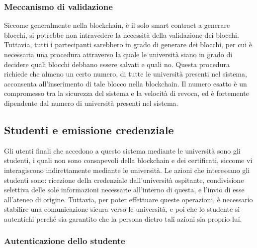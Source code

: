 \documentclass[a4paper,12pt]{article}
\begin{document}
\subsubsection{Meccanismo di validazione}
Siccome generalmente nella blockchain, è il solo smart contract a generare blocchi, si potrebbe non intravedere la necessità della validazione dei blocchi. Tuttavia, tutti i partecipanti sarebbero in grado di generare dei blocchi, per cui è necessaria una procedura attraverso la quale le università siano in grado di decidere quali blocchi debbano essere salvati e quali no. 
\newline Questa procedura richiede che almeno un certo numero, di tutte le università presenti nel sistema, acconsenta all'inserimento di tale blocco nella blockchain. Il numero esatto è un compromesso tra la sicurezza del sistema e la velocità di revoca, ed è fortemente dipendente dal numero di università presenti nel sistema.
\subsection{Studenti e emissione credenziale}
Gli utenti finali che accedono a questo sistema mediante le università sono gli studenti, i quali non sono consapevoli della blockchain e dei certificati, siccome vi interagiscono indirettamente mediante le università. Le azioni che interessano gli studenti sono: ricezione della credenziale dall'università ospitante, condivisione selettiva delle sole informazioni necessarie all'interno di questa, e l'invio di esse all'ateneo di origine.
\newline Tuttavia, per poter effettuare queste operazioni, è necessario stabilire una comunicazione sicura verso le università, e poi che lo studente si autentichi perché sia garantito che la persona dietro tali azioni sia proprio lui.
\subsubsection{Autenticazione dello studente}
\end{document}
